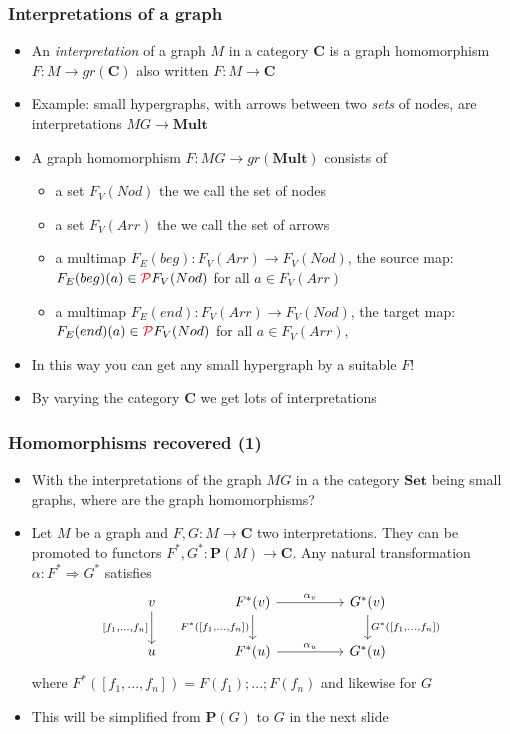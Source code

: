 \documentclass[handout]{beamer}
\newcommand{\To}{\Rightarrow}
\newcommand{\bfsf}[1]{{\boldsymbol{#1}}}
\newcommand{\Set}{\bfsf{Set}}
\newcommand{\CC}{\bfsf{C}}
\newcommand{\PP}{\bfsf{P}}
\newcommand{\Mult}{\bfsf{Mult}}
\begin{document}
\frame
  {   
    \frametitle{Interpretations  of a graph}\label{Ch3:interpretations}

 \begin{itemize}[<+->]
\item An \emph{interpretation} of a graph $M$ in a category $\CC$
is a graph homomorphism $F: M\to gr(\CC)$ also written $F : M\to \CC$
\item Example: small hypergraphs, with arrows  between two \emph{sets} of nodes,
are interpretations $MG\to \Mult$ 
\item A graph homomorphism $F : MG\to gr(\Mult)$ consists of
   \begin{itemize}[<+->]
\item a set $F_V(Nod)$ the we call the set of nodes
\item a set $F_V(Arr)$ the we call the set of arrows
\item a {\color{red}multi}map $F_E(beg) : F_V(Arr)\to F_V(Nod)$, the source map:  
$F_E(beg)(a)\in {\color{red}\operatorname{\mathcal{P}}} F_V(Nod)$ for all $a\in F_V(Arr)$
\item a {\color{red}multi}map $F_E(end) : F_V(Arr)\to F_V(Nod)$, the target map: 
 $F_E(end)(a)\in {\color{red}\operatorname{\mathcal{P}}} F_V(Nod)$  for all $a\in F_V(Arr)$,
   \end{itemize}
\item In this way you can get any small {\color{red}hyper}graph by a suitable $F$!
\item By varying the category $\CC$ we get lots of interpretations
 \end{itemize}

 }

\frame
  {   
    \frametitle{Homomorphisms recovered (1)}\label{Ch3:Homs1}

 \begin{itemize}[<+->]
\item With the {interpretations} of the graph $MG$ in a the category $\Set$
being small graphs, where are the graph homomorphisms?
\item Let $M$ be a graph and $F,G : M\to \CC$ two interpretations. They can be promoted
to functors $F^*,G^* : \PP(M)\to \CC$. Any natural transformation
$\alpha: F^* \To G^*$ satisfies
\[
\begin{tikzcd}[ampersand replacement=\&]
v \arrow[swap]{d}{[f_1,...,f_n]} \&\& {F^*(v)}  \arrow[swap]{d}{F^*([f_1,...,f_n])}\arrow{rr}{\alpha_v} 
\&\& {G^*(v})\arrow{d}{G^*([f_1,...,f_n])}\\
u \&\&{F^*(u)}  \arrow{rr}{\alpha_u}\& \& {G^*(u)}
\end{tikzcd}
\]
where $F^*([f_1,...,f_n]) = F(f_1);...;F(f_n)$ and likewise for $G$
\item This will be simplified from $\PP(G)$ to $G$ in the next slide
 \end{itemize}

 }
\end{document}
